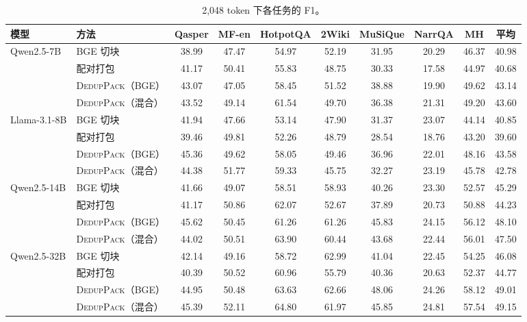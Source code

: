 \documentclass[11pt]{article}
\newcommand{\spk}{\textsc{DedupPack}}
\begin{document}
\begin{table}[t]
\centering
\small
\setlength{\tabcolsep}{4pt}
\begin{tabular}{llcccccc|cc}
\toprule
模型 & 方法 & Qasper & MF-en & HotpotQA & 2Wiki & MuSiQue & NarrQA & MH & 平均 \\
\midrule
\multirow{4}{*}{Qwen2.5-7B}
 & BGE 切块 & 38.99 & 47.47 & 54.97 & 52.19 & 31.95 & 20.29 & 46.37 & 40.98 \\
 & 配对打包 & 41.17 & 50.41 & 55.83 & 48.75 & 30.33 & 17.58 & 44.97 & 40.68 \\
 & \spk{}（BGE） & 43.07 & 47.05 & 58.45 & 51.52 & 38.88 & 19.90 & 49.62 & 43.14 \\
 & \spk{}（混合） & 43.52 & 49.14 & 61.54 & 49.70 & 36.38 & 21.31 & 49.20 & 43.60 \\
\midrule
\multirow{4}{*}{Llama-3.1-8B}
 & BGE 切块 & 41.94 & 47.66 & 53.14 & 47.90 & 31.37 & 23.07 & 44.14 & 40.85 \\
 & 配对打包 & 39.46 & 49.81 & 52.26 & 48.79 & 28.54 & 18.76 & 43.20 & 39.60 \\
 & \spk{}（BGE） & 45.36 & 49.62 & 58.05 & 49.46 & 36.96 & 22.01 & 48.16 & 43.58 \\
 & \spk{}（混合） & 44.38 & 51.77 & 59.33 & 45.75 & 32.27 & 23.19 & 45.78 & 42.78 \\
\midrule
\multirow{4}{*}{Qwen2.5-14B}
 & BGE 切块 & 41.66 & 49.07 & 58.51 & 58.93 & 40.26 & 23.30 & 52.57 & 45.29 \\
 & 配对打包 & 41.17 & 50.86 & 62.07 & 52.67 & 37.89 & 20.73 & 50.88 & 44.23 \\
 & \spk{}（BGE） & 45.62 & 50.45 & 61.26 & 61.26 & 45.83 & 24.15 & 56.12 & 48.10 \\
 & \spk{}（混合） & 44.02 & 50.51 & 63.90 & 60.44 & 43.68 & 22.44 & 56.01 & 47.50 \\
\midrule
\multirow{4}{*}{Qwen2.5-32B}
 & BGE 切块 & 42.14 & 49.16 & 58.72 & 62.99 & 41.04 & 22.45 & 54.25 & 46.08 \\
 & 配对打包 & 40.39 & 50.52 & 60.96 & 55.79 & 40.36 & 20.63 & 52.37 & 44.77 \\
 & \spk{}（BGE） & 44.95 & 50.48 & 63.63 & 62.66 & 48.06 & 24.26 & 58.12 & 49.01 \\
 & \spk{}（混合） & 45.39 & 52.11 & 64.80 & 61.97 & 45.85 & 24.81 & 57.54 & 49.15 \\
\bottomrule
\end{tabular}
\caption{2,048 token 下各任务的 F1。}
\label{tab:pertask2048}
\end{table}
\end{document}
